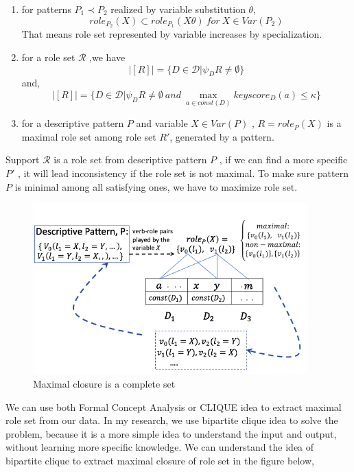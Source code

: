 \begin{enumerate}
\item for patterns $P_1\prec P_2$ realized by variable substitution $\theta$,
\begin{displaymath}
role_{P_2} (X) \subset role_{P_1} (X\theta)\ for\ X \in Var(P_2)
\end{displaymath}
That means role set represented by variable increases by specialization.
\item for a role set $\mathcal{R}$ ,we have
\begin{displaymath}
|[R]| = \{D\in \mathcal{D}|\psi_DR\ne \emptyset\}
\end{displaymath}
and,
\begin{displaymath}
|[R]| = \{D\in \mathcal{D}|\psi_DR\ne \emptyset\ and \ \max_{a\in const(D)}keyscore_D(a)\leq \kappa\}
\end{displaymath}
\item for a descriptive pattern $P$ and variable $X \in Var(P)$ , $R = role_P (X)$ is a maximal role set among role set $R'$, generated by a pattern. 
\end{enumerate}
Support $\mathcal{R}$ is a role set from descriptive pattern $P$ , if we can find a more specific $P'$ , it will lead inconsistency if the role set is not maximal. To make sure pattern $P$ is minimal among all satisfying ones, we have to maximize role set.\\
\begin{figure}[!h]
\centering
\includegraphics[width=300pt]{./pictures/0305-0.png}
\caption{Maximal closure is a complete set}
\end{figure}
We can use both Formal Concept Analysis or CLIQUE idea to extract maximal role set from our data. In my research, we use bipartite clique idea to solve the problem, because it is a more simple idea to understand the input and output, without learning more specific knowledge. We can understand the idea of bipartite clique to extract maximal closure of role set in the figure below,\\
